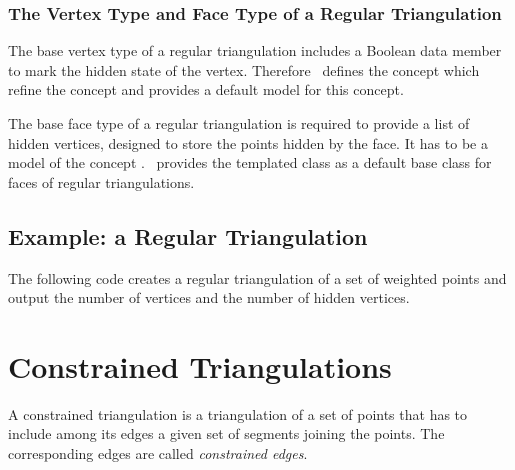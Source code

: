 \subsubsection{The Vertex Type and Face Type of a Regular Triangulation}

The base vertex type of a regular triangulation
includes a Boolean data member to mark the hidden state of the vertex.
Therefore \cgal\ defines the concept
 which refine
the concept 
and provides a default model 
for this concept.

The base face type of a regular triangulation
is required to provide a list of hidden vertices,
designed to store the points hidden by the face. It has to be a model
of the concept .
\cgal\ provides the templated class 
as a default base class for faces of regular triangulations.



\subsection{Example: a Regular Triangulation\label{Subsection_2D_Triangulations_Regular_Example}}

The following code  creates a regular triangulation 
of a set of weighted points and output the number
of vertices and the number of hidden vertices.



\section{Constrained Triangulations\label{Section_2D_Triangulations_Constrained}}

A constrained triangulation is a triangulation of a set of points
that has to include among its edges 
a given set of segments joining the points. The corresponding 
edges are called {\em constrained edges}. 

